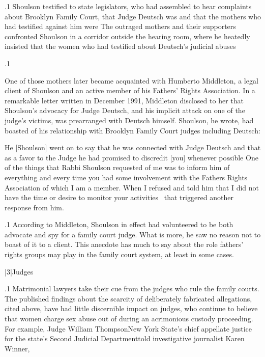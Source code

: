 \documentclass[11pt, twoside]{article}
\begin{document}
{\p.1{%
Shoulson testified to state legislators, who had assembled to hear
complaints about Brooklyn Family Court, that Judge Deutsch was  and that the mothers who had testified against
him were  The outraged mothers and their supporters
confronted Shoulson in a corridor outside the hearing room, where
he heatedly insisted that the women who had testified about Deutsch’s
judicial abuses 
}%

\p.1{%
One of those mothers later became acquainted with Humberto Middleton, a legal client of Shoulson and an active member of his Fathers’
Rights Association. In a remarkable letter written in December 1991,
Middleton disclosed to her that Shoulson’s advocacy for Judge Deutsch,
and his implicit attack on one of the judge’s victims, was prearranged
with Deutsch himself. Shoulson, he wrote, had boasted of his relationship with Brooklyn Family Court judges including Deutsch:

\begin{blockQuote}
He [Shoulson] went on to say that he was connected with Judge
Deutsch and that as a favor to the Judge he had promised to discredit [you] whenever possible\ellFour{2pt}{2pt} One of the things that Rabbi
Shoulson requested of me was to inform him of everything and
every time you had some involvement with the Fathers Rights Association of which I am a member. When I refused and told him
that I did not have the time or desire to
monitor your activities \ellThree{2pt}{2pt}\ that triggered another response from him.
\end{blockQuote}

}%

\p.1{%
According to Middleton, Shoulson in effect had volunteered to be
both advocate and spy for a family court judge. What is more, he saw no
reason not to boast of it to a client. This anecdote has much to say about
the role fathers’ rights groups may play in the family court system, at
least in some cases.
}%


\s|3|{Judges}

\p.1{%
\noindent{}Matrimonial lawyers take their cue from the judges who rule the family courts. The published findings about the scarcity of deliberately
fabricated allegations, cited above, have had little discernible impact on judges, who continue to believe that women charge sex abuse
out of  during an acrimonious custody proceeding. For
example, Judge William Thompson\mdash{}New York State’s chief appellate
justice for the state’s Second Judicial Department\mdash{}told investigative
journalist Karen Winner, 
}%

}
\end{document}
